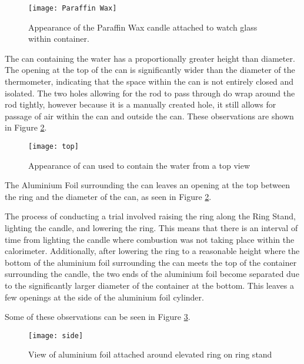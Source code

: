 \documentclass[
	letterpaper, %
	12pt, %
]{CSUniSchoolLabReport}
\begin{document}
\begin{figure}[H] %
  \centering %
  \texttt{[image: Paraffin Wax]} %
  \caption{Appearance of the Paraffin Wax candle attached to watch glass within container.}
  \label{fig:paraffin}
\end{figure}

\par The can containing the water has a proportionally greater height than diameter.
The opening at the top of the can is significantly wider than the diameter of the thermometer,
indicating that the space within the can is not entirely closed and isolated.
The two holes allowing for the rod to pass through do wrap around the rod
tightly, however because it is a manually created hole, it still allows for passage
of air within the can and outside the can. These observations are shown in
Figure \ref*{fig:cantop}.
\begin{figure}[H]
  \centering
  \texttt{[image: top]}
  \caption{Appearance of can used to contain the water from a top view}
  \label{fig:cantop}
\end{figure}

\par The Aluminium Foil surrounding the can leaves an opening at the top between
the ring and the diameter of the can, as seen in Figure \ref*{fig:cantop}.
\\
\par The process of conducting a trial involved raising the ring along the Ring Stand,
lighting the candle, and lowering the ring. This means that there is an interval of time
from lighting the candle where combustion was not taking place within the calorimeter.
Additionally, after lowering the ring to a reasonable height where the bottom of the
aluminium foil surrounding the can meets the top of the container surrounding the
candle, the two ends of the aluminium foil become separated due to the significantly
larger diameter of the container at the bottom. This leaves a few openings at the side
of the aluminium foil cylinder.
\\
\par Some of these observations can be seen in Figure \ref*{fig:canside}.
\begin{figure}[H]
  \centering
  \texttt{[image: side]}
  \caption{View of aluminium foil attached around elevated ring on ring stand}
  \label{fig:canside}
\end{figure}
\end{document}
